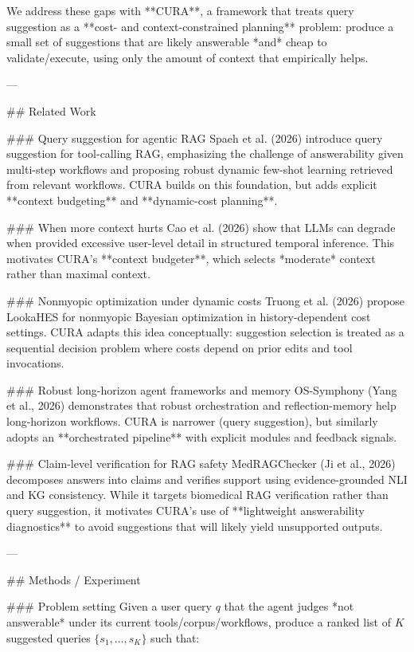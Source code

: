 We address these gaps with **CURA**, a framework that treats query suggestion as a **cost- and context-constrained planning** problem: produce a small set of suggestions that are likely answerable *and* cheap to validate/execute, using only the amount of context that empirically helps.

---

## Related Work  

### Query suggestion for agentic RAG  
Spaeh et al. (2026) introduce query suggestion for tool-calling RAG, emphasizing the challenge of answerability given multi-step workflows and proposing robust dynamic few-shot learning retrieved from relevant workflows. CURA builds on this foundation, but adds explicit **context budgeting** and **dynamic-cost planning**.

### When more context hurts  
Cao et al. (2026) show that LLMs can degrade when provided excessive user-level detail in structured temporal inference. This motivates CURA’s **context budgeter**, which selects *moderate* context rather than maximal context.

### Nonmyopic optimization under dynamic costs  
Truong et al. (2026) propose LookaHES for nonmyopic Bayesian optimization in history-dependent cost settings. CURA adapts this idea conceptually: suggestion selection is treated as a sequential decision problem where costs depend on prior edits and tool invocations.

### Robust long-horizon agent frameworks and memory  
OS-Symphony (Yang et al., 2026) demonstrates that robust orchestration and reflection-memory help long-horizon workflows. CURA is narrower (query suggestion), but similarly adopts an **orchestrated pipeline** with explicit modules and feedback signals.

### Claim-level verification for RAG safety  
MedRAGChecker (Ji et al., 2026) decomposes answers into claims and verifies support using evidence-grounded NLI and KG consistency. While it targets biomedical RAG verification rather than query suggestion, it motivates CURA’s use of **lightweight answerability diagnostics** to avoid suggestions that will likely yield unsupported outputs.

---

## Methods / Experiment  

### Problem setting  
Given a user query \(q\) that the agent judges *not answerable* under its current tools/corpus/workflows, produce a ranked list of \(K\) suggested queries \(\{s_1,\dots,s_K\}\) such that:

